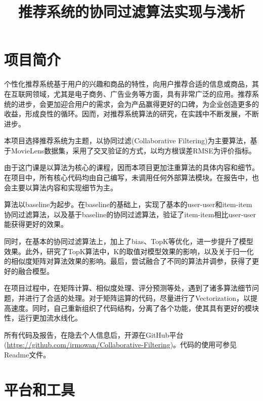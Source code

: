 \documentclass[utf8, a4paper, 11pt, onecolumn]{ctexart}
\title{推荐系统的协同过滤算法实现与浅析}
\begin{document}
\begin{spacing}{1.5}

\maketitle
\tableofcontents
\newpage

\end{spacing}

\begin{spacing}{1.25}

\section{项目简介}

个性化推荐系统基于用户的兴趣和商品的特性，向用户推荐合适的信息或商品，其在互联网领域，尤其是电子商务、广告业务等方面，具有非常广泛的应用。推荐系统的进步，会更加迎合用户的需求，会为产品赢得更好的口碑，为企业创造更多的收益，形成良性的循环。因而，对推荐系统算法的研究，在实践中不断发展，不断进步。

本项目选择推荐系统为主题，以协同过滤(Collaborative Filtering)为主要算法，基于MovieLens数据集，采用了交叉验证的方式，以均方根误差RMSE为评价指标。

由于这门课是以算法为核心的课程，因而本项目更加注重算法的具体内容和细节。在项目中，所有核心代码均由自己编写，未调用任何外部算法模块。在报告中，也会主要以算法内容和实现细节为主。

算法以baseline为起步。在baseline的基础上，实现了基本的user-user和item-item协同过滤算法，以及基于baseline的协同过滤算法，验证了item-item相比user-user能获得更好的效果。

同时，在基本的协同过滤算法上，加上了bias、TopK等优化，进一步提升了模型效果。此外，研究了TopK算法中，K的取值对模型效果的影响，以及关于归一化的相似度矩阵对算法效果的影响。最后，尝试融合了不同的算法并调参，获得了更好的融合模型。

在项目过程中，在矩阵计算、相似度处理、评分预测等处，遇到了诸多算法细节问题，并进行了合适的处理。对于矩阵运算的代码，尽量进行了Vectorization，以提高速度。同时，自己重新组织了代码结构，分离了各个功能，使其具有更好的模块性，运行更加流水线化。

所有代码及报告，在隐去个人信息后，开源在GitHub平台(\url{https://github.com/irmowan/Collaborative-Filtering})。代码的使用可参见Readme文件。

\section{平台和工具}


\end{spacing}
\end{document}
